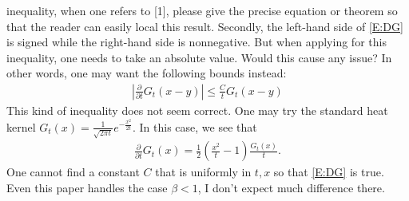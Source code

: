 \documentclass[12pt]{article} %
\begin{document}
\begin{enumerate}
		inequality, when one refers to [1], please give the precise equation or
		theorem so that the reader can easily local this result. Secondly, the
		left-hand side of \eqref{E:DG} is signed while the right-hand side is
		nonnegative. But when applying for this inequality, one needs to take an
		absolute value. Would this cause any issue? In other words, one may want
		the following bounds instead:
		\begin{align*}
			\left|\frac{\partial}{\partial t}G_t(x-y) \right|\le \frac{C}{t} G_t(x-y)
		\end{align*}
		This kind of inequality does not seem correct. One may try the standard
		heat kernel $G_t(x)=\frac{1}{\sqrt{2\pi t}} e^{- \frac{x^2}{2t}}$. In this
		case, we see that
		\begin{align*}
			\frac{\partial}{\partial t}	G_t(x) =
			\frac{1}{2}\left(\frac{x^2}{t}-1\right) \frac{G_t(x)}{t}.
		\end{align*}
		One cannot find a constant $C$ that is uniformly in $t,x$ so that
		\eqref{E:DG} is true. Even this paper handles the case $\beta<1$, I don't
		expect much difference there.
\end{enumerate}
\end{document}
